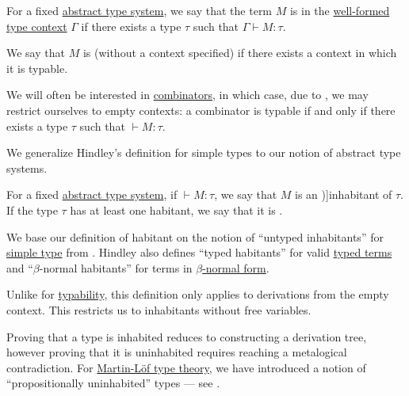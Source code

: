 \begin{definition}\label{def:typability}
  For a fixed \hyperref[def:abstract_type_system]{abstract type system}, we say that the term \( M \) is  in the \hyperref[rem:well_formed_context]{well-formed} \hyperref[def:type_context]{type context} \( \Gamma \) if there exists a type \( \tau \) such that \( \Gamma \vdash M: \tau \).

  We say that \( M \) is  (without a context specified) if there exists a context in which it is typable.
\end{definition}
\begin{comments}
  \item We will often be interested in \hyperref[def:lambda_combinator]{combinators}, in which case, due to , we may restrict ourselves to empty contexts: a combinator is typable if and only if there exists a type \( \tau \) such that \( \vdash M: \tau \).

  \item We generalize Hindley's definition for simple types to our notion of abstract type systems.
\end{comments}

\begin{definition}\label{def:type_habitation}
  For a fixed \hyperref[def:abstract_type_system]{abstract type system}, if \( \vdash M: \tau \), we say that \( M \) is an \term[en=untyped inhabitant (\cite[8A1]{Hindley1997BasicSTT})]{inhabitant} of \( \tau \). If the type \( \tau \) has at least one habitant, we say that it is .
\end{definition}
\begin{comments}
  \item We base our definition of habitant on the notion of \enquote{untyped inhabitants} for \hyperref[def:simple_type]{simple type} from \cite[def. 8A1]{Hindley1997BasicSTT}. Hindley also defines \enquote{typed habitants} for valid \hyperref[def:typed_lambda_term]{typed terms} and \enquote{\( \beta \)-normal habitants} for terms in \hyperref[def:lambda_term_normal_form]{\( \beta \)-normal form}.

  \item Unlike for \hyperref[def:typability]{typability}, this definition only applies to derivations from the empty context. This restricts us to inhabitants without free variables.

  \item Proving that a type is inhabited reduces to constructing a derivation tree, however proving that it is uninhabited requires reaching a metalogical contradiction. For \hyperref[def:mltt]{Martin-L\"of type theory}, we have introduced a notion of \enquote{propositionally uninhabited} types --- see .
\end{comments}


